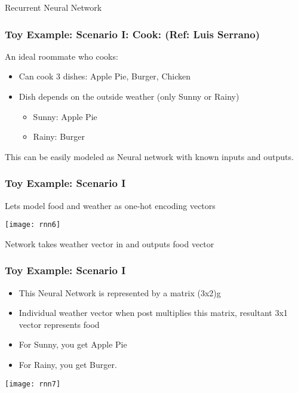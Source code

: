 \begin{frame}
  \begin{center}
    {\Large Recurrent Neural Network}
  \end{center}
\end{frame}

\begin{frame}[fragile] \frametitle{Toy Example: Scenario I: Cook: (Ref: Luis Serrano)}
An ideal roommate who cooks:
\begin{itemize}
\item Can cook 3 dishes: Apple Pie, Burger, Chicken
\item Dish depends on the outside weather (only Sunny or Rainy)
\begin{itemize}
\item Sunny: Apple Pie
\item Rainy: Burger
\end{itemize}
\end{itemize}
This can be easily modeled as Neural network with known inputs and outputs.
\end{frame}

\begin{frame}[fragile] \frametitle{Toy Example: Scenario I}
Lets model food and weather as one-hot encoding vectors
\begin{center}
\texttt{[image: rnn6]}
\end{center}
Network takes weather vector in and outputs food vector
\end{frame}

\begin{frame}[fragile] \frametitle{Toy Example: Scenario I}
\begin{itemize}
\item This Neural Network is represented by a matrix (3x2)g
\item Individual weather vector when post multiplies this matrix, resultant 3x1 vector represents food
\item For Sunny, you get Apple Pie
\item For Rainy, you get Burger.
\end{itemize}
\begin{center}
\texttt{[image: rnn7]}
\end{center}
\end{frame}

